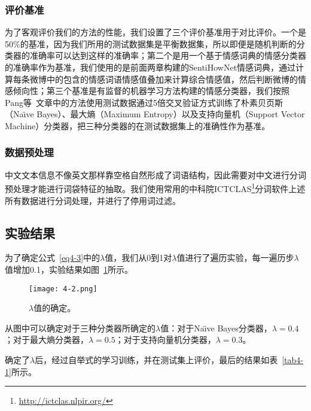 \subsubsection{评价基准}
为了客观评价我们的方法的性能，我们设置了三个评价基准用于对比评价。一个是50\%的基准，因为我们所用的测试数据集是平衡数据集，所以即便是随机判断的分类器的准确率可以达到这样的准确率；第二个是用一个基于情感词典的情感分类器的准确率作为基准，我们使用的是前面两章构建的SentiHowNet情感词典，通过计算每条微博中的包含的情感词语情感值叠加来计算综合情感值，然后判断微博的情感倾向性；第三个基准是有监督的机器学习方法构建的情感分类器，我们按照Pang等~\cite{Pang2002}文章中的方法使用测试数据通过5倍交叉验证方式训练了朴素贝页斯（Na\"\i ve Bayes）、最大熵（Maximum Entropy）以及支持向量机（Support Vector Machine）分类器，把三种分类器的在测试数据集上的准确性作为基准。

\subsubsection{数据预处理}
中文文本信息不像英文那样靠空格自然形成了词语结构，因此需要对中文进行分词预处理才能进行词袋特征的抽取。我们使用常用的中科院ICTCLAS\footnote{\url{http://ictclas.nlpir.org/}}分词软件上述所有数据进行分词处理，并进行了停用词过滤。

\subsection{实验结果}
\label{result}

为了确定公式~\ref{eq4-3}中的$ \lambda $值，我们从0到1对$ \lambda $值进行了遍历实验，每一遍历步$ \lambda $值增加0.1，实验结果如图~\ref{fig4-2}所示。

\begin{figure}[htp]
\centering
\texttt{[image: 4-2.png]}
\caption{$ \lambda $值的确定。}
\label{fig4-2}
\end{figure}
从图中可以确定对于三种分类器所确定的$ \lambda $值：对于Na\"\i ve Bayes分类器，$ \lambda=0.4 $；对于最大熵分类器，$ \lambda=0.5 $；对于支持向量机分类器，$ \lambda=0.3 $。

确定了$ \lambda$后，经过自举式的学习训练，并在测试集上评价，最后的结果如表~\ref{tab4-1}所示。

